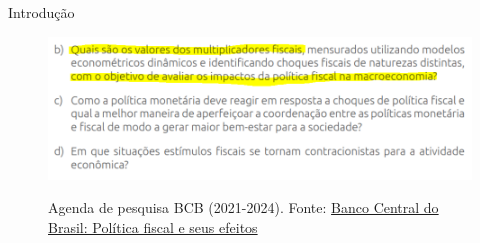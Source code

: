 \documentclass[10pt]{beamer}
\begin{document}

\begin{frame}
    {Introdução}
    \begin{figure}
        \centering
        \href{https://www.bcb.gov.br/publicacoes/agenda_pesq_macro}{\includegraphics[width=\textwidth]{./figures/aula9_fig1.PNG}}
        \caption{Agenda de pesquisa BCB (2021-2024). Fonte: \href{https://www.bcb.gov.br/publicacoes/agenda_pesq_macro}{Banco Central do Brasil: Política fiscal e seus efeitos}}
    \end{figure}
\end{frame}
\end{document}
